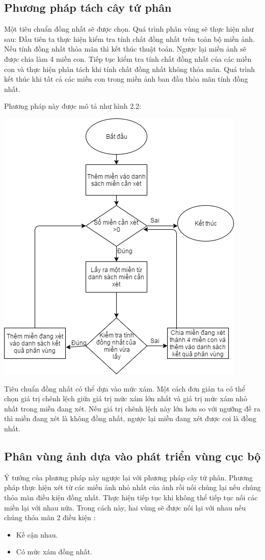 \documentclass[12pt, oneside, a4paper]{book}
\begin{document}
\subsection{Phương pháp tách cây tứ phân}
Một tiêu chuẩn đồng nhất sẽ được chọn. Quá trình phân vùng sẽ thực hiện như sau: Đầu tiên ta thực hiện kiểm tra tính chất đồng nhất trên toàn bộ miền ảnh. Nếu tính đồng nhất thỏa mãn thì kết thúc thuật toán. Ngược lại miền ảnh sẽ được chia làm 4 miền con. Tiếp tục kiểm tra tính chất đồng nhất của các miền con và thực hiện phân tách khi tính chất đồng nhất không thỏa mãn. Quá trình kết thúc khi tất cả các miền con trong miền ảnh ban đầu thỏa mãn tính đồng nhất.

Phương pháp này được mô tả như hình 2.2:
\begin{center}
\includegraphics[scale=0.7]{figure/sodothuattoan.png}
\end{center}
Tiêu chuẩn đồng nhất có thể dựa vào mức xám. Một cách đơn giản ta có thể chọn giá trị chênh lệch giữa giá trị mức xám lớn nhất và giá trị mức xám nhỏ nhất trong miền đang xét. Nếu giá trị chênh lệch này lớn hơn so với ngưỡng đề ra thì miền đang xét là không đồng nhất, ngược lại miền đang xét được coi là đồng nhất. 
\subsection{Phân vùng ảnh dựa vào phát triển vùng cục bộ}
Ý tưởng của phương pháp này ngược lại với phương pháp cây tứ phân. Phương pháp thực hiện xét từ các miền ảnh nhỏ nhất của ảnh rồi nối chúng lại nếu chúng thỏa mãn điều kiện đồng nhất. Thực hiện tiếp tục khi không thể tiếp tục nối các miền lại với nhau nữa.
Trong cách này, hai vùng sẽ được nối lại với nhau nếu chúng thỏa mãn 2 điều kiện :
\begin{itemize}
\item Kế cận nhau.
\item Có mức xám đồng nhất.
\end{itemize}
\end{document}
